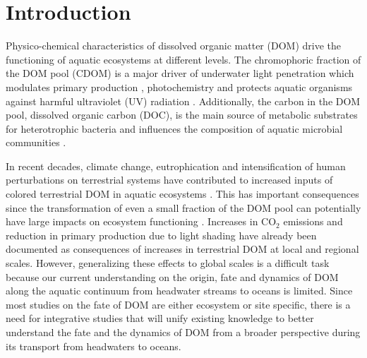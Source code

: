 
\section*{Introduction}
\label{sec:Introduction}

Physico-chemical characteristics of dissolved organic matter (DOM) drive the functioning of aquatic ecosystems at different levels. The chromophoric fraction of the DOM pool (CDOM) is a major driver of underwater light penetration \citep{Kirk1994} which modulates primary production \citep{Markager2004, Thrane2014, Seekell2015}, photochemistry and protects aquatic organisms against harmful ultraviolet (UV) radiation \citep{Hader2011}. Additionally, the carbon in the DOM pool, dissolved organic carbon (DOC), is the main source of metabolic substrates for heterotrophic bacteria and influences the composition of aquatic microbial communities \citep{Findlay2003}.

In recent decades, climate change, eutrophication and intensification of human perturbations on terrestrial systems have contributed to increased inputs of colored terrestrial DOM in aquatic ecosystems \citep{Roulet2006, Massicotte2013RSE, Weyhenmeyer2014, Haaland2010}. This has important consequences since the transformation of even a small fraction of the DOM pool can potentially have large impacts on ecosystem functioning \citep{Prairie2008}. Increases in CO$_2$ emissions \citep{Lapierre2013} and reduction in primary production due to light shading \citep{Seekell2015, Thrane2014} have already been documented as consequences of increases in terrestrial DOM at local and regional scales. However, generalizing these effects to global scales is a difficult task because our current understanding on the origin, fate and dynamics of DOM along the aquatic continuum from headwater streams to oceans is limited. Since most studies on the fate of DOM are either ecosystem or site specific, there is a need for integrative studies that will unify existing knowledge to better understand the fate and the dynamics of DOM from a broader perspective during its transport from headwaters to oceans.

